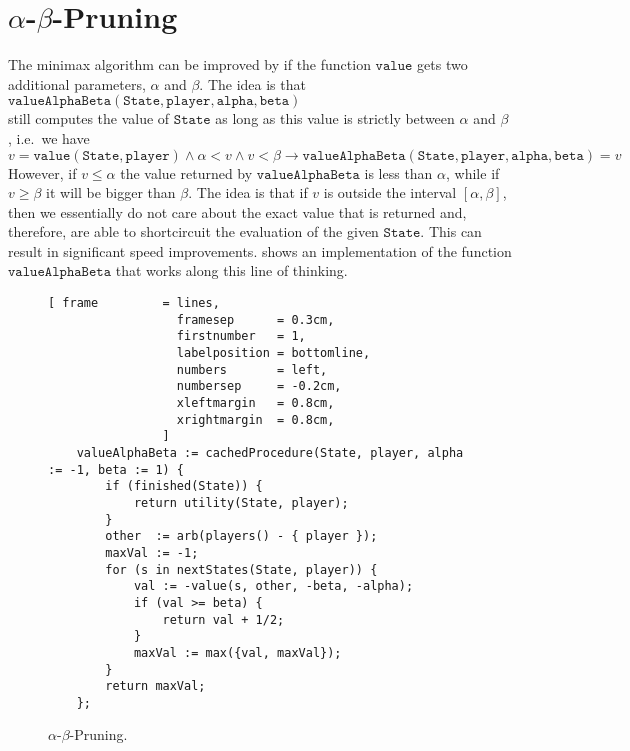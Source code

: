 \section{$\alpha$-$\beta$-Pruning}
The minimax algorithm can be improved by if the function $\mathtt{value}$ gets two additional parameters,
$\alpha$ and $\beta$.  The idea is that
\\[0.2cm]
\hspace*{1.3cm}
$\mathtt{valueAlphaBeta}(\mathtt{State}, \mathtt{player}, \mathtt{alpha}, \mathtt{beta})$
\\[0.2cm]
still computes the value of $\mathtt{State}$ as long as this value is strictly between $\alpha$ and $\beta$,
i.e.~we have
\\[0.2cm]
\hspace*{1.3cm}
$v = \mathtt{value}(\mathtt{State}, \mathtt{player}) \wedge \alpha < v \wedge v < \beta \rightarrow
 \mathtt{valueAlphaBeta}(\mathtt{State}, \mathtt{player}, \mathtt{alpha}, \mathtt{beta}) = v
$
\\[0.2cm]
However, if $v \leq \alpha$  the value returned by 
$\mathtt{valueAlphaBeta}$ is less than $\alpha$, while if $v \geq \beta$ it will be bigger than $\beta$.  The
idea is that if $v$ is outside the interval $[\alpha,  \beta]$, then we essentially do not care about the exact
value that is returned and, therefore, are able to shortcircuit the evaluation of the given $\mathtt{State}$.
This can result in significant speed improvements.   shows an implementation of the
function $\mathtt{valueAlphaBeta}$ that works along this line of thinking.


\begin{figure}[!ht]
\centering
\begin{Verbatim}[ frame         = lines, 
                  framesep      = 0.3cm, 
                  firstnumber   = 1,
                  labelposition = bottomline,
                  numbers       = left,
                  numbersep     = -0.2cm,
                  xleftmargin   = 0.8cm,
                  xrightmargin  = 0.8cm,
                ]
    valueAlphaBeta := cachedProcedure(State, player, alpha := -1, beta := 1) {
        if (finished(State)) {
            return utility(State, player);
        }
        other  := arb(players() - { player });
        maxVal := -1;
        for (s in nextStates(State, player)) {
            val := -value(s, other, -beta, -alpha);
            if (val >= beta) {
                return val + 1/2; 
            }
            maxVal := max({val, maxVal});
        }
        return maxVal;
    };
\end{Verbatim}
\vspace*{-0.3cm}
\caption{$\alpha$-$\beta$-Pruning.}
\label{fig:game-alpha-beta.stlx}
\end{figure}


